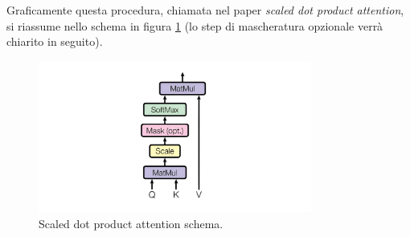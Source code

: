 \documentclass[12pt,a4paper,twoside,openright]{book}
\begin{document}
\begin{enumerate}
    Graficamente questa procedura, chiamata nel paper \emph{scaled dot product attention}, si riassume nello schema in figura \ref{fig:dotproduct-attention} (lo step di mascheratura opzionale verrà chiarito in seguito).
    \begin{figure}
        \centering
        \includegraphics[width=0.8\textwidth]{images/attention_product.png}
        \caption{Scaled dot product attention schema.}
        \label{fig:dotproduct-attention}
    \end{figure}
    
\end{enumerate}
\end{document}
